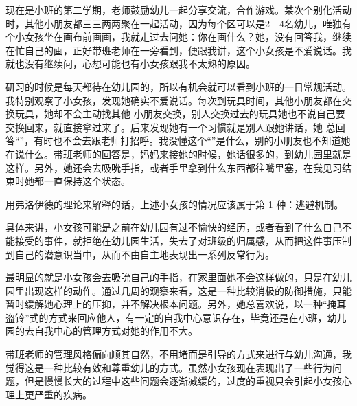 \documentclass[a4paper, oneside, 11pt, UTF8]{ctexart}
\begin{document}
\begin{tcolorbox}[enhanced,attach boxed title to top center={yshift=-3mm,yshifttext=-1mm},
  colback=blue!5!white,colframe=blue!75!black,colbacktitle=red!80!black,
  title=案例,fonttitle=\bfseries, fontupper=\CTEXindent,
  boxed title style={size=small,colframe=red!50!black}]
现在是小班的第二学期，老师鼓励幼儿一起分享交流，合作游戏。某次个别化活动时，其他小朋友都三三两两聚在一起活动，因为每个区可以是2  - 4名幼儿，唯独有个小女孩坐在画布前画画，我就走过去问她：你在画什么？她，没有回答我，继续在忙自己的画，正好带班老师在一旁看到，便跟我讲，这个小女孩是不爱说话。我就也没有继续问，心想可能也有小女孩跟我不太熟的原因。\par
研习的时候是每天都待在幼儿园的，所以有机会就可以看到小班的一日常规活动。我特别观察了小女孩，发现她确实不爱说话。每次到玩具时间，其他小朋友都在交换玩具，她却不会主动找其他
小朋友交换，别人交换过去的玩具她也不说自己要交换回来，就直接拿过来了。后来发现她有一个习惯就是别人跟她讲话，她
总回答“”，有时也不会去跟老师打招呼。我没懂这个“”是什么，别的小朋友也不知道她在说什么。带班老师的回答是，妈妈来接她的时候，她话很多的，到幼儿园里就是这样。另外，她还会去吸吮手指，或者手里拿到什么东西都往嘴里塞，在我见习结束时她都一直保持这个状态。
\end{tcolorbox}



用弗洛伊德的理论来解释的话，上述小女孩的情况应该属于第 1 种：逃避机制。\par
具体来讲，小女孩可能是之前在幼儿园有过不愉快的经历，或者看到了什么自己不能接受的事件，就拒绝在幼儿园生活，失去了对班级的归属感，从而把这件事压制到自己的潜意识当中，从而不由自主地表现出一系列反常行为。\par
最明显的就是小女孩会去吸吮自己的手指，在家里面她不会这样做的，只是在幼儿园里出现这样的动作。通过几周的观察来看，这是一种比较消极的防御措施，只能暂时缓解她心理上的压抑，并不解决根本问题。另外，她总喜欢说，以一种“掩耳盗铃”式的方式来回应他人，有一定的自我中心意识存在，毕竟还是在小班，幼儿园的去自我中心的管理方式对她的作用不大。\par
带班老师的管理风格偏向顺其自然，不用堵而是引导的方式来进行与幼儿沟通，我觉得这是一种比较有效和尊重幼儿的方式。虽然小女孩现在表现出了一些行为问题，但是慢慢长大的过程中这些问题会逐渐减缓的，过度的重视只会引起小女孩心理上更严重的疾病。
\end{document}
